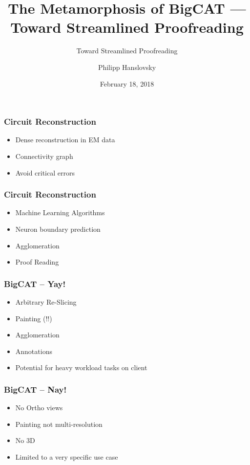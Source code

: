 \documentclass[aspectratio=169]{beamer}
\title[Janelia Theme]{The Metamorphosis of BigCAT --- Toward Streamlined Proofreading}
\subtitle{Toward Streamlined Proofreading}
\author{Philipp Hanslovsky}
\date{February 18, 2018}
\begin{document}
\setcounter{showProgressBar}{0}
\setcounter{showSlideNumbers}{0}

\frame{\titlepage}

\begin{frame}
    \frametitle{Circuit Reconstruction}
    
    \begin{itemize}
          \item Dense reconstruction in EM data
          \item Connectivity graph
          \item Avoid critical errors
    \end{itemize}
\end{frame}

\begin{frame}
    \frametitle{Circuit Reconstruction}
    \begin{itemize}
          \item Machine Learning Algorithms
          \item Neuron boundary prediction
          \item Agglomeration
          \item Proof Reading
    \end{itemize}
\end{frame}

\begin{frame}
    \frametitle{BigCAT -- Yay!}
    \begin{itemize}
          \item Arbitrary Re-Slicing
          \item Painting (!!)
          \item Agglomeration
          \item Annotations
          \item Potential for heavy workload tasks on client
    \end{itemize}
\end{frame}

\begin{frame}
    \frametitle{BigCAT -- Nay!}
    \begin{itemize}
          \item No Ortho views
          \item Painting not multi-resolution
          \item No 3D
          \item Limited to a very specific use case
    \end{itemize}
\end{frame}
\end{document}
